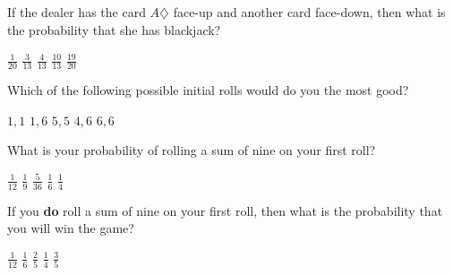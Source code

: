 \documentclass[answers,12pt]{exam}
\begin{document}
\begin{questions}
\question\label{LastBJ}
If the dealer has the card $A\diamondsuit$
face-up and another card face-down, then what is the probability
that she has blackjack?\\
\begin{oneparchoices}
\choice $\frac{1}{20}$ %
\choice $\frac{3}{13}$ %
\correctchoice $\frac{4}{13}$
\choice $\frac{10}{13}$
\choice $\frac{19}{20}$ %
\end{oneparchoices}


\question\label{FirstCraps}
Which of the following possible initial rolls
would do you the most good?\\
\begin{oneparchoices}
\choice $1,1$ %
\correctchoice $1,6$
\choice $5,5$
\choice $4,6$
\choice $6,6$ %
\end{oneparchoices}

\question
What is your probability of rolling a sum
of nine on your first roll?\\
\begin{oneparchoices}
\choice $\frac{1}{12}$ %
\correctchoice $\frac{1}{9}$
\choice $\frac{5}{36}$
\choice $\frac{1}{6}$
\choice $\frac{1}{4}$ %
\end{oneparchoices}

\question\label{LastCraps}
If you {\bf do} roll a sum of nine on your first roll,
then what is the probability that you will win the game?\\
\begin{oneparchoices}
\choice $\frac{1}{12}$ %
\choice $\frac{1}{6}$  %
\correctchoice $\frac{2}{5}$  %
\choice $\frac{1}{4}$  %
\choice $\frac{3}{5}$  %
\end{oneparchoices}



\end{questions}
\end{document}
